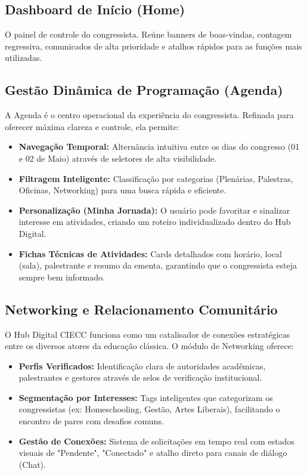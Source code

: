 \documentclass[12px,a4paper]{article}
\begin{document}
\subsection{Dashboard de Início (Home)}
O painel de controle do congressista. Reúne banners de boas-vindas, contagem regressiva, comunicados de alta prioridade e atalhos rápidos para as funções mais utilizadas.

\subsection{Gestão Dinâmica de Programação (Agenda)}
A Agenda é o centro operacional da experiência do congressista. Refinada para oferecer máxima clareza e controle, ela permite:
\begin{itemize}
    \item \textbf{Navegação Temporal:} Alternância intuitiva entre os dias do congresso (01 e 02 de Maio) através de seletores de alta visibilidade.
    \item \textbf{Filtragem Inteligente:} Classificação por categorias (Plenárias, Palestras, Oficinas, Networking) para uma busca rápida e eficiente.
    \item \textbf{Personalização (Minha Jornada):} O usuário pode favoritar e sinalizar interesse em atividades, criando um roteiro individualizado dentro do Hub Digital.
    \item \textbf{Fichas Técnicas de Atividades:} Cards detalhados com horário, local (sala), palestrante e resumo da ementa, garantindo que o congressista esteja sempre bem informado.
\end{itemize}

\subsection{Networking e Relacionamento Comunitário}
O Hub Digital CIECC funciona como um catalisador de conexões estratégicas entre os diversos atores da educação clássica. O módulo de Networking oferece:
\begin{itemize}
    \item \textbf{Perfis Verificados:} Identificação clara de autoridades acadêmicas, palestrantes e gestores através de selos de verificação institucional.
    \item \textbf{Segmentação por Interesses:} Tags inteligentes que categorizam os congressistas (ex: Homeschooling, Gestão, Artes Liberais), facilitando o encontro de pares com desafios comuns.
    \item \textbf{Gestão de Conexões:} Sistema de solicitações em tempo real com estados visuais de "Pendente", "Conectado" e atalho direto para canais de diálogo (Chat).
\end{itemize}
\end{document}

